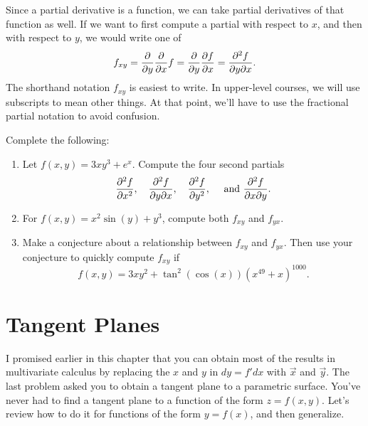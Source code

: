 Since a partial derivative is a function, we can take partial derivatives of that function as well.  
If we want to first compute a partial with respect to $x$, and then with respect to $y$, we would write one of $$f_{xy}=\displaystyle\frac{\partial}{\partial y}\frac{\partial}{\partial x}f = \frac{\partial}{\partial y}\frac{\partial f}{\partial x} = \frac{\partial^2 f}{\partial y \partial x}.$$
The shorthand notation $f_{xy}$ is easiest to write. In upper-level courses, we will use subscripts to mean other things. At that point, we'll have to use the fractional partial notation to avoid confusion.

\begin{problem}\label{second partials agree}%
Complete the following:
\begin{enumerate}
 \item Let $f(x,y)=3xy^3+e^{x}.$
Compute the four second partials $$\displaystyle \frac{\partial^2 f}{ \partial x^2},\quad \displaystyle\frac{\partial^2 f}{\partial y \partial x},\quad \displaystyle\frac{\partial^2 f}{\partial y^2}, \quad \text{ and }\displaystyle\frac{\partial^2 f}{\partial x \partial y}.$$
 \item For $f(x,y)=x^2\sin(y)+y^3$, compute both $f_{xy}$ and $f_{yx}$.  
 \item Make a conjecture about a relationship between $f_{xy}$ and $f_{yx}$. Then use your conjecture to quickly compute $f_{xy}$ if $$f(x,y)=3xy^2+\tan^{2}(\cos(x)) (x^{49}+x)^{1000}.$$ 
\end{enumerate}
\end{problem}



\section{Tangent Planes}
I promised earlier in this chapter that you can obtain most of the results in multivariate calculus by replacing the $x$ and $y$ in $dy=f'dx$ with $\vec x$ and $\vec y$. The last problem asked you to obtain a tangent plane to a parametric surface. You've never had to find a tangent plane to a function of the form $z=f(x,y)$.  Let's review how to do it for functions of the form $y=f(x)$, and then generalize. 

